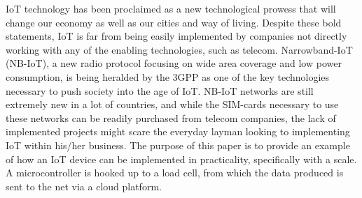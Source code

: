 IoT technology has been proclaimed as a new technological prowess that will change our economy as well as our cities and way of living. Despite these bold statements, IoT is far from being easily implemented by companies not directly working with any of the enabling technologies, such as telecom. Narrowband-IoT (NB-IoT), a new radio protocol focusing on wide area coverage and low power consumption, is being heralded by the 3GPP as one of the key technologies necessary to push society into the age of IoT. NB-IoT networks are still extremely new in a lot of countries, and while the SIM-cards necessary to use these networks can be readily purchased from telecom companies, the lack of implemented projects might scare the everyday layman looking to implementing IoT within his/her business. The purpose of this paper is to provide an example of how an IoT device can be implemented in practicality, specifically with a scale. A microcontroller is hooked up to a load cell, from which the data produced is sent to the net via a cloud platform. 

